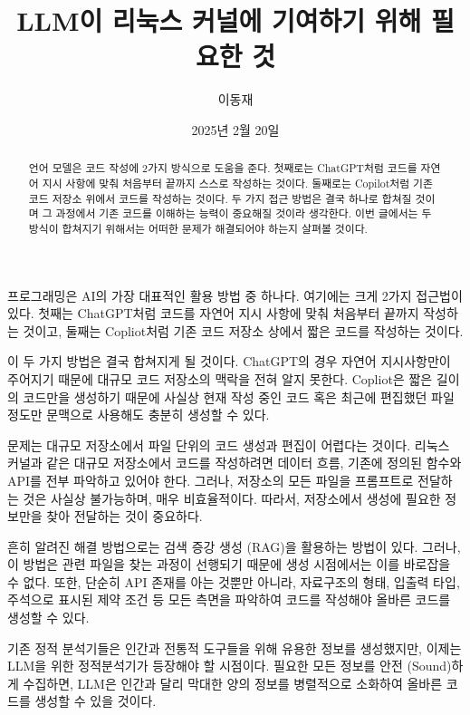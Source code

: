 \documentclass[11pt, oneside]{article}   	%
\title{LLM이 리눅스 커널에 기여하기 위해 필요한 것}
\author{이동재}
\date{2025년 2월 20일}
\begin{document}
\maketitle



\begin{abstract}
  언어 모델은 코드 작성에 2가지 방식으로 도움을 준다. 첫째로는 ChatGPT처럼 코드를 자연어 지시 사항에 맞춰 처음부터 끝까지 스스로 작성하는 것이다.
  둘째로는 Copilot처럼 기존 코드 저장소 위에서 코드를 작성하는 것이다.
  두 가지 접근 방법은 결국 하나로 합쳐질 것이며 그 과정에서 기존 코드를 이해하는 능력이 중요해질 것이라 생각한다.
  이번 글에서는 두 방식이 합쳐지기 위해서는 어떠한 문제가 해결되어야 하는지 살펴볼 것이다.
\end{abstract}
  프로그래밍은 AI의 가장 대표적인 활용 방법 중 하나다. 여기에는 크게 2가지 접근법이 있다. 첫째는 ChatGPT처럼 코드를 자연어 지시 사항에 맞춰 처음부터 끝까지 작성하는 것이고, 둘째는 Copliot처럼 기존 코드 저장소 상에서 짧은 코드를 작성하는 것이다.
 
  이 두 가지 방법은 결국 합쳐지게 될 것이다. ChatGPT의 경우 자연어 지시사항만이 주어지기 때문에 대규모 코드 저장소의 맥락을 전혀 알지 못한다. Copliot은 짧은 길이의 코드만을 생성하기 때문에 사실상 현재 작성 중인 코드 혹은 최근에 편집했던 파일 정도만 문맥으로 사용해도 충분히 생성할 수 있다.
 
  문제는 대규모 저장소에서 파일 단위의 코드 생성과 편집이 어렵다는 것이다. 리눅스 커널과 같은 대규모 저장소에서 코드를 작성하려면 데이터 흐름, 기존에 정의된 함수와 API를 전부 파악하고 있어야 한다.
  그러나, 저장소의 모든 파일을 프롬프트로 전달하는 것은 사실상 불가능하며, 매우 비효율적이다. 따라서, 저장소에서 생성에 필요한 정보만을 찾아 전달하는 것이 중요하다.
 
  흔히 알려진 해결 방법으로는 검색 증강 생성 (RAG)을 활용하는 방법이 있다. 그러나, 이 방법은 관련 파일을 찾는 과정이 선행되기 때문에 생성 시점에서는 이를 바로잡을 수 없다.
  또한, 단순히 API 존재를 아는 것뿐만 아니라, 자료구조의 형태, 입출력 타입, 주석으로 표시된 제약 조건 등 모든 측면을 파악하여 코드를 작성해야 올바른 코드를 생성할 수 있다.
 
  기존 정적 분석기들은 인간과 전통적 도구들을 위해 유용한 정보를 생성했지만, 이제는 LLM을 위한 정적분석기가 등장해야 할 시점이다. 필요한 모든 정보를 안전 (Sound)하게 수집하면, LLM은 인간과 달리 막대한 양의 정보를 병렬적으로 소화하여 올바른 코드를 생성할 수 있을 것이다.
\end{document}
